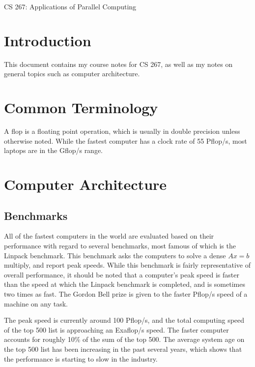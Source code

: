 \documentclass[10pt]{article}
\begin{document}
\begin{centering}
\Large CS 267: Applications of Parallel Computing\\
\end{centering}

\tableofcontents
\clearpage

\section{Introduction}
\begin{flushleft}\justify

This document contains my course notes for CS 267, as well as my notes on general topics such as computer architecture.

\section{Common Terminology}

A flop is a floating point operation, which is usually in double precision unless otherwise noted. While the fastest computer has a clock rate of 55 Pflop/s, most laptops are in the Gflop/s range. 

\section{Computer Architecture}

\subsection{Benchmarks}

All of the fastest computers in the world are evaluated based on their performance with regard to several benchmarks, most famous of which is the Linpack benchmark. This benchmark asks the computers to solve a dense \(Ax=b\) multiply, and report peak speeds. While this benchmark is fairly representative of overall performance, it should be noted that a computer's peak speed is faster than the speed at which the Linpack benchmark is completed, and is sometimes two times as fast. The Gordon Bell prize is given to the faster Pflop/s speed of a machine on any task.

The peak speed is currently around 100 Pflop/s, and the total computing speed of the top 500 list is approaching an Exaflop/s speed. The faster computer accounts for roughly 10\% of the sum of the top 500. The average system age on the top 500 list has been increasing in the past several years, which shows that the performance is starting to slow in the industry.


\end{flushleft}
\end{document}
